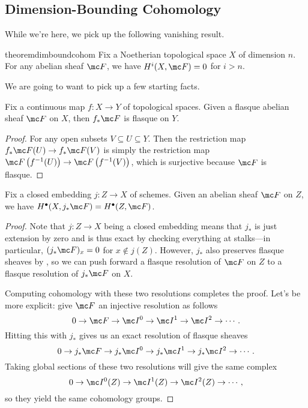 \documentclass[../notes.tex]{subfiles}
\begin{document}
\subsection{Dimension-Bounding Cohomology}
While we're here, we pick up the following vanishing result.
\begin{restatable}{theorem}{dimboundcohom} \label{thm:dimension-bound-cohom}
	Fix a Noetherian topological space $X$ of dimension $n$. For any abelian sheaf $\mc F$, we have $H^i(X,\mc F)=0$ for $i>n$.
\end{restatable}
We are going to want to pick up a few starting facts.
\begin{lemma} \label{lem:pull-preserves-flasque}
	Fix a continuous map $f\colon X\to Y$ of topological spaces. Given a flasque abelian sheaf $\mc F$ on $X$, then $f_*\mc F$ is flasque on $Y$.
\end{lemma}
\begin{proof}
	For any open subsets $V\subseteq U\subseteq Y$. Then the restriction map $f_*\mc F(U)\to f_*\mc F(V)$ is simply the restriction map $\mc F\left(f^{-1}(U)\right)\to\mc F\left(f^{-1}(V)\right)$, which is surjective because $\mc F$ is flasque.
\end{proof}
\begin{corollary} \label{cor:closed-embed-preserve-cohom}
	Fix a closed embedding $j\colon Z\to X$ of schemes. Given an abelian sheaf $\mc F$ on $Z$, we have $H^\bullet(X,j_*\mc F)=H^\bullet(Z,\mc F)$.
\end{corollary}
\begin{proof}
	Note that $j\colon Z\to X$ being a closed embedding means that $j_*$ is just extension by zero and is thus exact by checking everything at stalks---in particular, $(j_*\mc F)_x=0$ for $x\notin j(Z)$. However, $j_*$ also preserves flasque sheaves by , so we can push forward a flasque resolution of $\mc F$ on $Z$ to a flasque resolution of $j_*\mc F$ on $X$.
	
	Computing cohomology with these two resolutions completes the proof. Let's be more explicit: give $\mc F$ an injective resolution as follows
	\[0\to\mc F\to\mc I^0\to\mc I^1\to\mc I^2\to\cdots.\]
	Hitting this with $j_*$ gives us an exact resolution of flasque sheaves
	\[0\to j_*\mc F\to j_*\mc I^0\to j_*\mc I^1\to j_*\mc I^2\to\cdots.\]
	Taking global sections of these two resolutions will give the same complex
	\[0\to\mc I^0(Z)\to\mc I^1(Z)\to\mc I^2(Z)\to\cdots,\]
	so they yield the same cohomology groups.
\end{proof}
\end{document}
